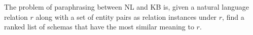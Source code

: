 

%


The problem of paraphrasing between NL and KB is,
given a natural language relation $r$ along with a set of
entity pairs as relation instances under $r$,
find a ranked list of schemas that have the most similar meaning
to $r$. 



